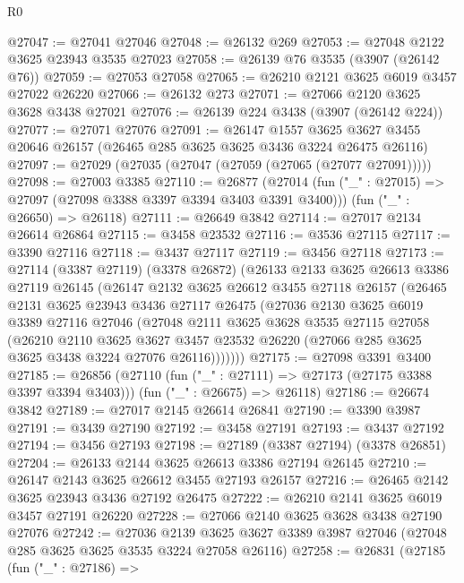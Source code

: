 \begin{lexlean}{R0}
\begin{coremodule}
@27047 := @27041 @27046
@27048 := @26132 @269
@27053 := @27048 @2122 @3625 @23943 @3535 @27023
@27058 := @26139 @76 @3535 (@3907 (@26142 @76))
@27059 := @27053 @27058
@27065 := @26210 @2121 @3625 @6019 @3457 @27022 @26220
@27066 := @26132 @273
@27071 := @27066 @2120 @3625 @3628 @3438 @27021
@27076 := @26139 @224 @3438 (@3907 (@26142 @224))
@27077 := @27071 @27076
@27091 := @26147
    @1557
    @3625
    @3627
    @3455
    @20646
    @26157
    (@26465 @285 @3625 @3625 @3436 @3224 @26475 @26116)
@27097 := @27029 (@27035 (@27047 (@27059 (@27065 (@27077 @27091)))))
@27098 := @27003 @3385
@27110 := @26877
    (@27014 (fun ("_" : @27015) => @27097 (@27098 @3388 @3397 @3394 @3403 @3391 @3400)))
    (fun ("_" : @26650) => @26118)
@27111 := @26649 @3842
@27114 := @27017 @2134 @26614 @26864
@27115 := @3458 @23532
@27116 := @3536 @27115
@27117 := @3390 @27116
@27118 := @3437 @27117
@27119 := @3456 @27118
@27173 := @27114
    (@3387 @27119)
    (@3378 @26872)
    (@26133
      @2133
      @3625
      @26613
      @3386
      @27119
      @26145
      (@26147
        @2132
        @3625
        @26612
        @3455
        @27118
        @26157
        (@26465
          @2131
          @3625
          @23943
          @3436
          @27117
          @26475
          (@27036
            @2130
            @3625
            @6019
            @3389
            @27116
            @27046
            (@27048
              @2111
              @3625
              @3628
              @3535
              @27115
              @27058
              (@26210
                @2110
                @3625
                @3627
                @3457
                @23532
                @26220
                (@27066 @285 @3625 @3625 @3438 @3224 @27076 @26116)))))))
@27175 := @27098 @3391 @3400
@27185 := @26856
    (@27110 (fun ("_" : @27111) => @27173 (@27175 @3388 @3397 @3394 @3403)))
    (fun ("_" : @26675) => @26118)
@27186 := @26674 @3842
@27189 := @27017 @2145 @26614 @26841
@27190 := @3390 @3987
@27191 := @3439 @27190
@27192 := @3458 @27191
@27193 := @3437 @27192
@27194 := @3456 @27193
@27198 := @27189 (@3387 @27194) (@3378 @26851)
@27204 := @26133 @2144 @3625 @26613 @3386 @27194 @26145
@27210 := @26147 @2143 @3625 @26612 @3455 @27193 @26157
@27216 := @26465 @2142 @3625 @23943 @3436 @27192 @26475
@27222 := @26210 @2141 @3625 @6019 @3457 @27191 @26220
@27228 := @27066 @2140 @3625 @3628 @3438 @27190 @27076
@27242 := @27036
    @2139
    @3625
    @3627
    @3389
    @3987
    @27046
    (@27048 @285 @3625 @3625 @3535 @3224 @27058 @26116)
@27258 := @26831
    (@27185
      (fun ("_" : @27186) =>

\end{coremodule}
\end{lexlean}
